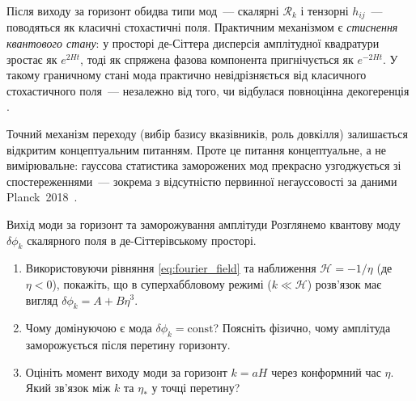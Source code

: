 \begin{keybox}[title={Зауваження про квантово-класичний
перехід скалярних і тензорних мод}]
Після виходу за горизонт обидва типи мод~--- скалярні
$\mathcal{R}_k$ і тензорні $h_{ij}$~--- поводяться як
класичні стохастичні поля. Практичним механізмом є
\emph{стиснення квантового стану}: у просторі де-Сіттера
дисперсія амплітудної квадратури зростає як $e^{2Ht}$,
тоді як спряжена фазова компонента пригнічується як
$e^{-2Ht}$. У такому граничному стані мода практично
невідрізняється від класичного стохастичного поля~---
незалежно від того, чи відбулася повноцінна декогеренція
\cite{polarski_starobinsky_1996, kiefer_polarski_1998}.

Точний механізм переходу (вибір базису вказівників, роль
довкілля) залишається відкритим концептуальним питанням.
Проте це питання концептуальне, а не вимірювальне: гауссова
статистика заморожених мод прекрасно узгоджується зі
спостереженнями~--- зокрема з відсутністю первинної
негауссовості за даними Planck~2018~\cite{planck_2018}.
\end{keybox}


\begin{problem}{Вихід моди за горизонт та заморожування амплітуди}
Розглянемо квантову моду $\delta\phi_k$ скалярного поля в де-Сіттерівському просторі.

\begin{enumerate}
    \item Використовуючи рівняння \eqref{eq:fourier_field} та наближення
          $\mathcal{H} = -1/\eta$ (де $\eta < 0$), покажіть, що в суперхаббловому
          режимі ($k \ll \mathcal{H}$) розв'язок має вигляд $\delta\phi_k = A + B\eta^3$.
    \item Чому домінуючою є мода $\delta\phi_k = \mathrm{const}$? Поясніть фізично,
          чому амплітуда заморожується після перетину горизонту.
    \item Оцініть момент виходу моди за горизонт $k = aH$ через конформний час $\eta$.
          Який зв'язок між $k$ та $\eta_*$ у точці перетину?
\end{enumerate}
\end{problem}


